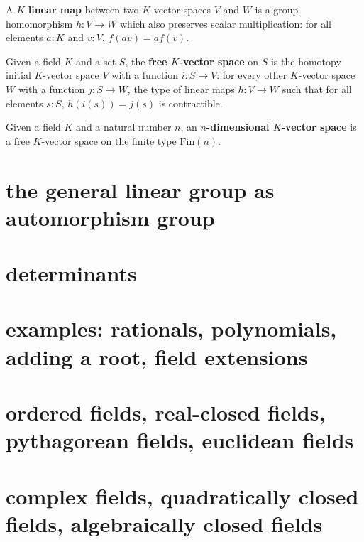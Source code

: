 \begin{definition}
A $K$-\textbf{linear map} between two $K$-vector spaces $V$ and $W$ is a group homomorphism $h:V \to W$ which also preserves scalar multiplication: for all elements $a:K$ and $v:V$, $f(a v) = a f(v)$. 
\end{definition}

\begin{definition}
Given a field $K$ and a set $S$, the \textbf{free $K$-vector space} on $S$ is the homotopy initial $K$-vector space $V$ with a function $i:S \to V$: for every other $K$-vector space $W$ with a function $j:S \to W$, the type of linear maps $h:V \to W$ such that for all elements $s:S$, $h(i(s)) = j(s)$ is contractible. 
\end{definition}

\begin{definition}
Given a field $K$ and a natural number $n$, an \textbf{$n$-dimensional $K$-vector space} is a free $K$-vector space on the finite type $\mathrm{Fin}(n)$. 
\end{definition}

\section{the general linear group as automorphism group}
\section{determinants\titledagger}
\section{examples: rationals, polynomials, adding a root, field extensions}
\section{ordered fields, real-closed fields, pythagorean fields, euclidean fields}
\section{complex fields, quadratically closed fields, algebraically closed fields}

